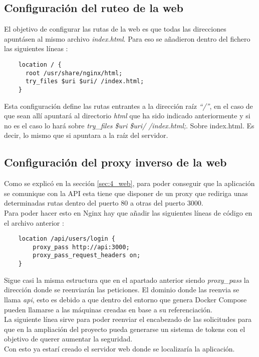 \subsection{Configuración del ruteo de la web}
El objetivo de configurar las rutas de la web es que todas las direcciones apuntásen al mismo archivo \textit{index.html}. Para eso se añadieron dentro del fichero las siguientes líneas \cite{nginx-routing}:
\begin{verbatim}
    location / {
      root /usr/share/nginx/html;
      try_files $uri $uri/ /index.html;
    }
\end{verbatim}
Esta configuración define las rutas entrantes a la dirección raíz \textit{``/''}, en el caso de que sean allí apuntará al directorio \textit{html} que ha sido indicado anteriormente y si no es el caso lo hará sobre \textit{try\_files \$uri \$uri/ /index.html;}. Sobre index.html. Es decir, lo mismo que si apuntara a la raíz del servidor.

\subsection{Configuración del proxy inverso de la web}
Como se explicó en la sección \ref{sec:4_web}, para poder conseguir que la aplicación se comunique con la API esta tiene que disponer de un proxy que rediriga unas determinadas rutas dentro del puerto 80 a otras del puerto 3000.
\\Para poder hacer esto en Nginx hay que añadir las siguientes líneas de código en el archivo anterior \cite{proxy-reverse}:
\begin{verbatim}
    location /api/users/login {
        proxy_pass http://api:3000;
        proxy_pass_request_headers on;
    }
\end{verbatim}
Sigue casi la misma estructura que en el apartado anterior siendo \textit{proxy\_pass} la dirección donde se reenviarán las peticiones. El dominio donde las reenvia se llama \textit{api}, esto es debido a que dentro del entorno que genera Docker Compose pueden llamarse a las máquinas creadas en base a su referenciación.
\\La siguiente línea sirve para poder reenviar el encabezado de las solicitudes para que en la ampliación del proyecto pueda generarse un sistema de tokens con el objetivo de querer aumentar la seguridad.
\\Con esto ya estarí creado el servidor web donde se localizaría la aplicación.
